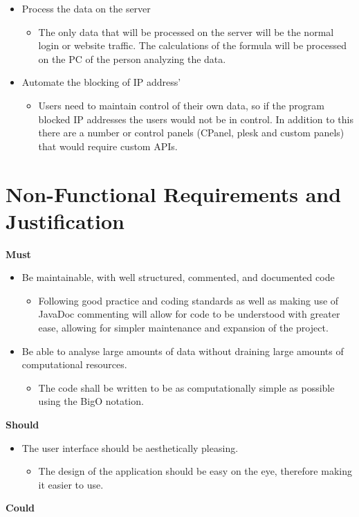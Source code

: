 \begin{itemize}
    \item Process the data on the server
    \begin{itemize}
        \item The only data that will be processed on the server will be the normal login or website traffic. The calculations of the formula will be processed on the PC of the person analyzing the data.
    \end{itemize}
    \item Automate the blocking of IP address' 
    \begin{itemize}
        \item Users need to maintain control of their own data, so if the program blocked IP addresses the users would not be in control. In addition to this there are a number or control panels (CPanel, plesk and custom panels) that would require custom APIs.
    \end{itemize}
\end{itemize}

\section{Non-Functional Requirements and Justification}
\textbf{Must}
\begin{itemize}
    \item Be maintainable, with well structured, commented, and documented code
    \begin{itemize}
        \item Following good practice and coding standards as well as making use of JavaDoc commenting will allow for code to be understood with greater ease, allowing for simpler maintenance and expansion of the project. 
    \end{itemize}
    \item Be able to analyse large amounts of data without draining large amounts of computational resources.
    \begin{itemize}
        \item The code shall be written to be as computationally simple as possible using the BigO notation.
    \end{itemize}
\end{itemize}
\textbf{Should}
\begin{itemize}
    \item The user interface should be aesthetically pleasing. 
    \begin{itemize}
        \item The design of the application should be easy on the eye, therefore making it easier to use.
    \end{itemize}
\end{itemize}
\textbf{Could}

